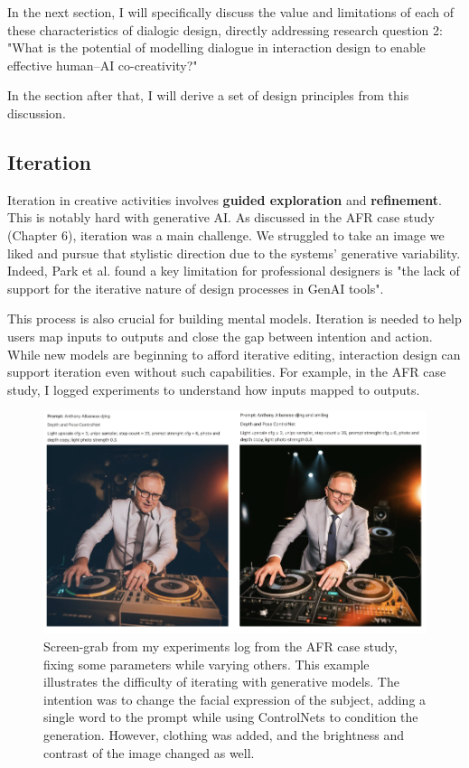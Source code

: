 In the next section, I will specifically discuss the value and limitations of each of these characteristics of dialogic design, directly addressing research question 2: "What is the potential of modelling dialogue in interaction design to enable effective human–AI co-creativity?"

In the section after that, I will derive a set of design principles from this discussion. 

\subsection{Iteration}
Iteration in creative activities involves \textbf{guided exploration} and \textbf{refinement}. This is notably hard with generative AI. As discussed in the AFR case study (Chapter 6), iteration was a main challenge. We struggled to take an image we liked and pursue that stylistic direction due to the systems' generative variability. Indeed, Park et al. \cite{Park2024-gw} found a key limitation for professional designers is "the lack of support for the iterative nature of design processes in GenAI tools".

This process is also crucial for building mental models. Iteration is needed to help users map inputs to outputs and close the gap between intention and action. While new models are beginning to afford iterative editing, interaction design can support iteration even without such capabilities. For example, in the AFR case study, I logged experiments to understand how inputs mapped to outputs.

\begin{figure}
    \centering
    \includegraphics[width=1\linewidth]{alboexperiments.png}
    \caption{Screen-grab from my experiments log from the AFR case study, fixing some parameters while varying others. This example illustrates the difficulty of iterating with generative models. The intention was to change the facial expression of the subject, adding a single word to the prompt while using ControlNets to condition the generation. However, clothing was added, and the brightness and contrast of the image changed as well.}
    \label{fig:albo_series}
\end{figure}

